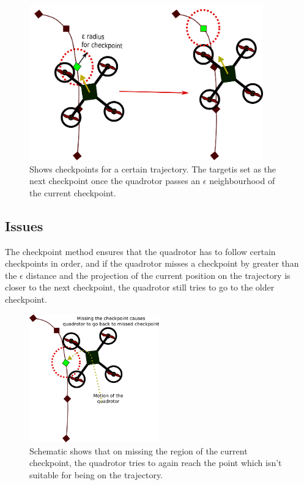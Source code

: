 \documentclass[hidelinks,BTech]{iitmdiss}
\begin{document}
\begin{figure}[H]
  \centering
    \includegraphics[width=0.9\textwidth]{Checkpoint_trajectory.png}
     \caption{Shows checkpoints for a certain trajectory. The targetis set as the next checkpoint once the quadrotor passes an $\epsilon$ neighbourhood of the current checkpoint.}
\end{figure}

	
\subsection*{Issues}
The checkpoint method ensures that the quadrotor has to follow certain checkpoints in order, and if the quadrotor misses a checkpoint by greater than the $\epsilon$ distance and the projection of the current position on the trajectory is closer to the next checkpoint, the quadrotor still tries to go to the older checkpoint.

\begin{figure}[H]
  \centering
    \includegraphics[width=0.5\textwidth]{Checkpoint_trajectory_miss.png}
     \caption{Schematic shows that on missing the region of the current checkpoint, the quadrotor tries to again reach the point which isn't suitable for being on the trajectory.}
\end{figure}
\end{document}
